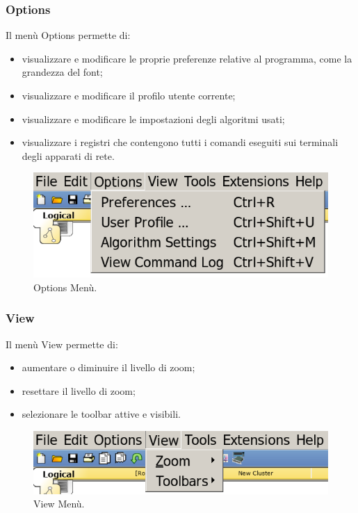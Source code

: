 \subsubsection{Options}
Il menù Options permette di: 

\begin{itemize}
    \item visualizzare e modificare le proprie preferenze relative al programma, come la grandezza del font;
    \item visualizzare e modificare il profilo utente corrente;
    \item visualizzare e modificare le impostazioni degli algoritmi usati;
    \item visualizzare i registri che contengono tutti i comandi eseguiti sui terminali degli apparati di rete.
\end{itemize}

\begin{figure}[htbp]
    \centerline{\includegraphics[scale=.3]{images/02.packet-tracer/options.png}}
    \caption{Options Menù.}
\end{figure}

\subsubsection{View}
Il menù View permette di: 

\begin{itemize}
    \item aumentare o diminuire il livello di zoom;
    \item resettare il livello di zoom;
    \item selezionare le toolbar attive e visibili.
\end{itemize}

\begin{figure}[htbp]
    \centerline{\includegraphics[scale=.3]{images/02.packet-tracer/view.png}}
    \caption{View Menù.}
\end{figure}

